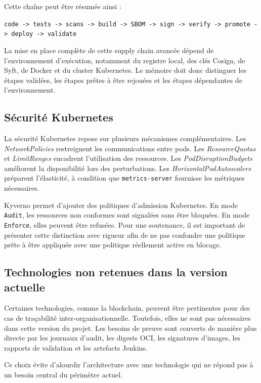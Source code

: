 Cette chaîne peut être résumée ainsi :

\begin{center}
\texttt{code -> tests -> scans -> build -> SBOM -> sign -> verify -> promote -> deploy -> validate}
\end{center}

La mise en place complète de cette supply chain avancée dépend de l'environnement d'exécution, notamment du registre local, des clés Cosign, de Syft, de Docker et du cluster Kubernetes. Le mémoire doit donc distinguer les étapes validées, les étapes prêtes à être rejouées et les étapes dépendantes de l'environnement.

\subsection{Sécurité Kubernetes}

La sécurité Kubernetes repose sur plusieurs mécanismes complémentaires. Les \textit{NetworkPolicies} restreignent les communications entre pods. Les \textit{ResourceQuotas} et \textit{LimitRanges} encadrent l'utilisation des ressources. Les \textit{PodDisruptionBudgets} améliorent la disponibilité lors des perturbations. Les \textit{HorizontalPodAutoscalers} préparent l'élasticité, à condition que \texttt{metrics-server} fournisse les métriques nécessaires.

Kyverno permet d'ajouter des politiques d'admission Kubernetes. En mode \texttt{Audit}, les ressources non conformes sont signalées sans être bloquées. En mode \texttt{Enforce}, elles peuvent être refusées. Pour une soutenance, il est important de présenter cette distinction avec rigueur afin de ne pas confondre une politique prête à être appliquée avec une politique réellement active en blocage.

\subsection{Technologies non retenues dans la version actuelle}

Certaines technologies, comme la blockchain, peuvent être pertinentes pour des cas de traçabilité inter-organisationnelle. Toutefois, elles ne sont pas nécessaires dans cette version du projet. Les besoins de preuve sont couverts de manière plus directe par les journaux d'audit, les digests OCI, les signatures d'images, les rapports de validation et les artefacts Jenkins.

Ce choix évite d'alourdir l'architecture avec une technologie qui ne répond pas à un besoin central du périmètre actuel.

